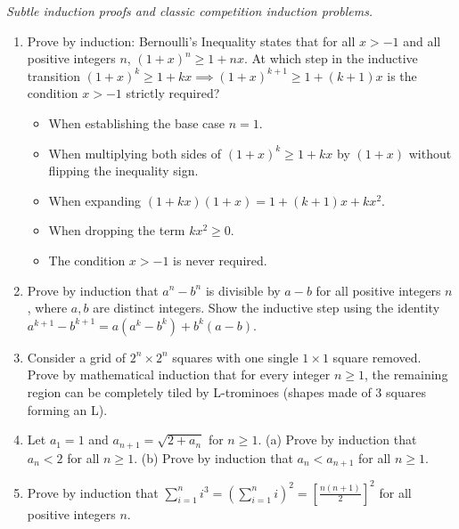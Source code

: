 \documentclass[11pt,a4paper]{article}
\begin{document}
\noindent\textit{Subtle induction proofs and classic competition induction problems.}

\begin{enumerate}

\item Prove by induction: Bernoulli's Inequality states that for all $x > -1$ and all positive integers $n$, $(1+x)^n \ge 1 + nx$. At which step in the inductive transition $(1+x)^k \ge 1+kx \implies (1+x)^{k+1} \ge 1+(k+1)x$ is the condition $x > -1$ strictly required?
\begin{itemize}
\item[A)] When establishing the base case $n=1$.
\item[B)] When multiplying both sides of $(1+x)^k \ge 1+kx$ by $(1+x)$ without flipping the inequality sign.
\item[C)] When expanding $(1+kx)(1+x) = 1 + (k+1)x + kx^2$.
\item[D)] When dropping the term $kx^2 \ge 0$.
\item[E)] The condition $x > -1$ is never required.
\end{itemize}

\item Prove by induction that $a^n - b^n$ is divisible by $a - b$ for all positive integers $n$, where $a,b$ are distinct integers. Show the inductive step using the identity $a^{k+1} - b^{k+1} = a(a^k - b^k) + b^k(a - b)$.

\item Consider a grid of $2^n \times 2^n$ squares with one single $1 \times 1$ square removed. Prove by mathematical induction that for every integer $n \ge 1$, the remaining region can be completely tiled by L-trominoes (shapes made of 3 squares forming an L).

\item Let $a_1 = 1$ and $a_{n+1} = \sqrt{2 + a_n}$ for $n \ge 1$. (a) Prove by induction that $a_n < 2$ for all $n \ge 1$. (b) Prove by induction that $a_n < a_{n+1}$ for all $n \ge 1$.

\item Prove by induction that $\sum_{i=1}^n i^3 = \left(\sum_{i=1}^n i\right)^2 = \left[\frac{n(n+1)}{2}\right]^2$ for all positive integers $n$.

\end{enumerate}

\end{document}
